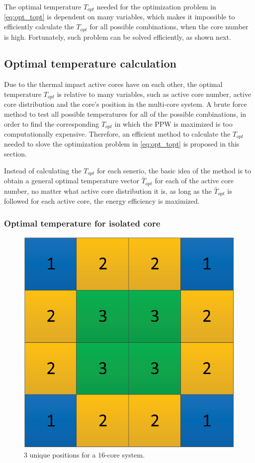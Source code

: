 The optimal temperature $T_{opt}$ needed for the optimization problem in \eqref{eq:opt_topt} is dependent on many variables, which makes it impossible to efficiently calculate the $T_{opt}$ for all possible combinations, when the core number is high. Fortunately, such problem can be solved efficiently, as shown next.

\subsection{Optimal temperature calculation}
Due to the thermal impact active cores have on each other, the optimal temperature $T_{opt}$ is relative to many variables, such as active core number, active core distribution and the core's position in the multi-core system. A brute force method to test all possible temperatures for all of the possible combinations, in order to find the corresponding $T_{opt}$ in which the PPW is maximized is too computationally expensive. Therefore, an efficient method to calculate the $T_{opt}$ needed to slove the optimization problem in \eqref{eq:opt_topt} is proposed in this section.

Instead of calculating the $T_{opt}$ for each senerio, the basic idea of the method is to obtain a general optimal temperature vector $\bar{T}_{opt}$ for each of the active core number, no matter what active core distribution it is, as long as the $\bar{T}_{opt}$ is followed for each active core, the energy efficiency is maximized.

\subsubsection{Optimal temperature for isolated core}

\begin{figure}
\centering
\includegraphics[width=0.46\linewidth]{fig/unique_position.eps}
\caption{$3$ unique positions for a $16$-core system.}
\label{fig:unique_position}
\end{figure}

